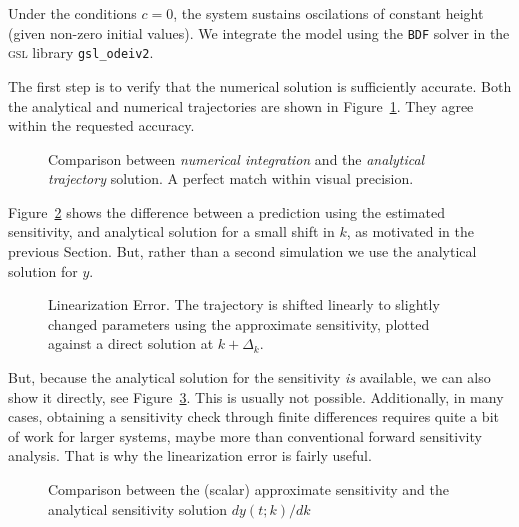 \documentclass[utf8,english,DIV=12]{scrartcl}
\begin{document}
Under the conditions $c=0$, the system sustains oscilations of constant height
(given non-zero initial values). We integrate the model using the
\texttt{BDF} solver in the \textsc{gsl} library \texttt{gsl\_odeiv2}.

The first step is to verify that the numerical solution is
sufficiently accurate. Both the analytical and numerical trajectories
are shown in Figure~\ref{fig:dampedGSLvsASolTraj}. They agree within
the requested accuracy.

\begin{figure}\sffamily\firalining
  \centering
  
  \caption{Comparison between \emph{numerical integration} and the
    \emph{analytical trajectory} solution. A perfect match within
    visual precision.\label{fig:dampedGSLvsASolTraj}}
\end{figure}

Figure~\ref{fig:dampedlinerr} shows the difference between a
prediction using the estimated sensitivity, and analytical solution
for a small shift in $k$, as motivated in the previous Section. But,
rather than a second simulation we use the analytical solution for
$y$.

\begin{figure}\sffamily\firalining
  \centering
  
  \caption{Linearization Error. The trajectory is shifted linearly to
    slightly changed parameters using the approximate sensitivity,
    plotted against a direct solution at
    $k+\Delta_k$.  \label{fig:dampedlinerr}}
\end{figure}

But, because the analytical solution for the sensitivity \emph{is}
available, we can also show it directly, see
Figure~\ref{fig:dampedGSLvsASolSensitivity}. This is usually not
possible. Additionally, in many cases, obtaining a sensitivity check
through finite differences requires quite a bit of work for larger
systems, maybe more than conventional forward sensitivity
analysis. That is why the linearization error is fairly useful.

\begin{figure}\sffamily\firalining
  \centering
  
  \caption{Comparison between the (scalar) approximate sensitivity and the
    analytical sensitivity solution
    $dy(t;k)/dk$ \label{fig:dampedGSLvsASolSensitivity} }
\end{figure}
\end{document}
